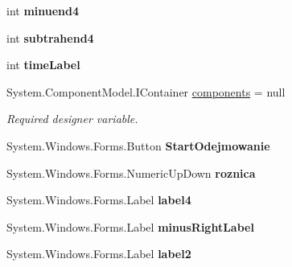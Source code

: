 \begin{DoxyCompactItemize}
\mbox{\label{class_quiz___matematyczny_1_1_odejmowanie_a00ff6534b34c833269a83cf32f6e5548}} 
int {\bfseries minuend4}
\item 
\mbox{\label{class_quiz___matematyczny_1_1_odejmowanie_a48fa15aecf6c60179e0bd9b350e0f68d}} 
int {\bfseries subtrahend4}
\item 
\mbox{\label{class_quiz___matematyczny_1_1_odejmowanie_a6952e44fba3ecc1320f0f58c1d59b46a}} 
int {\bfseries time\+Label}
\item 
System.\+Component\+Model.\+I\+Container \mbox{\hyperlink{class_quiz___matematyczny_1_1_odejmowanie_a6e5b31dba0a8df17e1f82b25ac12d610}{components}} = null
\begin{DoxyCompactList}\small\item\em Required designer variable. \end{DoxyCompactList}\item 
\mbox{\label{class_quiz___matematyczny_1_1_odejmowanie_aa1799c890e91ff77783c5c732d9d9f0b}} 
System.\+Windows.\+Forms.\+Button {\bfseries Start\+Odejmowanie}
\item 
\mbox{\label{class_quiz___matematyczny_1_1_odejmowanie_a536741089336f78766d5db8a250af634}} 
System.\+Windows.\+Forms.\+Numeric\+Up\+Down {\bfseries roznica}
\item 
\mbox{\label{class_quiz___matematyczny_1_1_odejmowanie_a96a0c7e33f9267e2d8449049f571940e}} 
System.\+Windows.\+Forms.\+Label {\bfseries label4}
\item 
\mbox{\label{class_quiz___matematyczny_1_1_odejmowanie_abc739f7e680f102b13bb368b71090b30}} 
System.\+Windows.\+Forms.\+Label {\bfseries minus\+Right\+Label}
\item 
\mbox{\label{class_quiz___matematyczny_1_1_odejmowanie_ae4f574344016c8d18819c753cd77cd63}} 
System.\+Windows.\+Forms.\+Label {\bfseries label2}
\item 

\end{DoxyCompactItemize}
